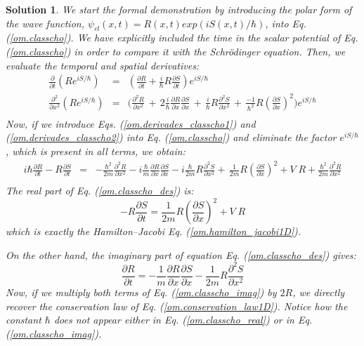 \documentclass[nofootinbib, secnumarabic, amsmath, nobibnotes,10pt,aps,pra]{revtex4-1}
\newtheorem{solution}{Solution}
\newcommand{\eref}[1]{Eq. (\ref{#1})}
\begin{document}
\begin{solution}
We start the formal demonstration by introducing the polar form of the wave function, $\psi_{cl}(x,t) = R(x,t) exp(i S(x,t)/\hbar)$, into \eref{om.classcho}. We have explicitly included the time in the scalar potential of \eref{om.classcho} in order to compare it with the Schr\"odinger equation. Then, we evaluate the temporal and spatial derivatives:
\begin{eqnarray}
\label{om.derivades_classcho1}
\frac {\partial} {\partial t} \left(Re^{i S/\hbar}\right)& = &\left( \frac {\partial R} {\partial t} + \frac {i} {\hbar} R\frac{\partial S} {\partial t} \right)e^{i S/\hbar}\\
\label{om.derivades_classcho2}
\frac {\partial^2} {\partial x^2} \left(Re^{i S/\hbar}\right) & = &\!\Bigg( \frac {\partial^2 R} {\partial x^2} \,{+}\, 2 \frac {i} {\hbar} \frac{\partial R} {\partial x} \frac{\partial S} {\partial x} \,{+}\, \frac {i} {\hbar} R \frac{\partial^2 S} {\partial x^2} \,{+}\, \frac {-1} {\hbar^2} R \left( \frac{\partial S} {\partial x}\right)^2\! \Bigg) e^{i S/\hbar}\nonumber\\
\end{eqnarray}
Now, if we introduce Eqs. (\ref{om.derivades_classcho1}) and
(\ref{om.derivades_classcho2}) into \eref{om.classcho} and
eliminate the factor $e^{i S/\hbar}$, which is present in all terms,
we obtain:
\begin{eqnarray}
\label{om.classcho_des}
i \hbar \frac {\partial R} {\partial t} - R\frac{\partial S}
{\partial t} &=& -\frac {\hbar^2}{2m} \frac {\partial^2 R} {\partial
x^2} - i\frac {\hbar}{m} \frac{\partial R} {\partial x}
\frac{\partial S} {\partial x} - i \frac {\hbar}{2m} R
\frac{\partial^2 S} {\partial x^2} +\, \frac {1} {2m} R \left(
\frac{\partial S} {\partial x}\right)^2+ V \; R + \frac {\hbar^{2}} {2 m} \frac { {\partial}^2 R} {\partial x^2}\nonumber\\
\end{eqnarray}
The real part of \eref{om.classcho_des} is:
\begin{equation}
\label{om.classcho_real}
 -R\frac{\partial S} {\partial t} = \frac {1} {2m} R \left( \frac{\partial S} {\partial x}\right)^2 + V \; R
\end{equation}
which is exactly the Hamilton--Jacobi \eref{om.hamilton_jacobi1D}. 

On the other hand, the imaginary part of equation \eref{om.classcho_des} gives:
\begin{equation}	
\label{om.classcho_imag}
 \frac {\partial R} {\partial t} = -\frac {1}{m} \frac{\partial R} {\partial x} \frac{\partial S} {\partial x} - \frac {1}{2m} R \frac{\partial^2 S} {\partial x^2}
\end{equation}
Now, if we multiply both terms of \eref{om.classcho_imag} by $2 R$,
we directly recover the conservation law of
\eref{om.conservation_law1D}. Notice how the constant $\hbar$ does
not appear either in \eref{om.classcho_real} or in
\eref{om.classcho_imag}.
\end{solution}
\end{document}
